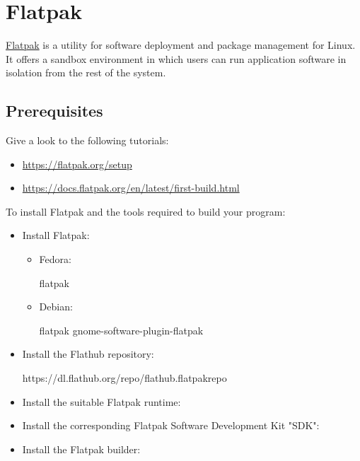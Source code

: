 \section{Flatpak}

\href{https://flatpak.org}{Flatpak} is a utility for software deployment and package management for Linux. \\
It offers a sandbox environment in which users can run application software in isolation from the rest of the system. 

\subsection{Prerequisites}

Give a look to the following tutorials:
\begin{itemize}
\item \href{https://flatpak.org/setup}{https://flatpak.org/setup}
\item \href{https://docs.flatpak.org/en/latest/first-build.html}{https://docs.flatpak.org/en/latest/first-build.html}
\end{itemize}
To install Flatpak and the tools required to build your program:
\begin{itemize}
\item Install Flatpak: 
\begin{itemize}
\item Fedora: 
{\footnotesize{
\begin{scriptii}
\fprompt{~}    flatpak
\end{scriptii}
}}
\item Debian:
{\footnotesize{
\begin{scriptii}
\uprompt{~}    flatpak
\uprompt{~}    gnome-software-plugin-flatpak
\end{scriptii}
}}
\end{itemize}
\item Install the Flathub repository: 
{\scriptsize{
\begin{scripti}
   https://dl.flathub.org/repo/flathub.flatpakrepo
\end{scripti}
}}
\item Install the suitable Flatpak runtime:
{\footnotesize{
\begin{scripti}
   
\end{scripti}
}}
\item Install the corresponding Flatpak Software Development Kit "SDK":
{\footnotesize{
\begin{scripti}
   
\end{scripti}
}}
\item Install the Flatpak builder:
{\footnotesize{
\begin{scripti}
   
\end{scripti}
}}
\end{itemize}

